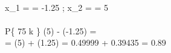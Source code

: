 \\ x_{1} =  = -1.25
\; \; ; \; \;
x_{2} =  = 5
\\
\\ P\left \{ 75 \leqslant k  \right \} \approx \Phi (5) - \Phi(-1.25) =
\\ = \Phi (5) + \Phi(1.25) = 0.49999 + 0.39435 = 0.89
